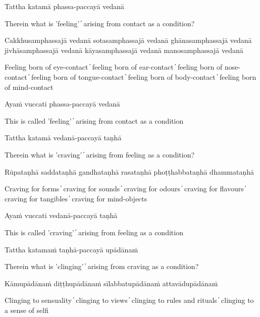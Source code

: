 Tattha katamā phassa-paccayā vedanā

\begin{cprenglish}
Therein what is 'feeling'  ̓  arising from contact as a condition?
\end{cprenglish}

Cakkhusamphassajā vedanā sotasamphassajā vedanā ghānasamphassajā vedanā jivhāsamphassajā vedanā kāyasamphassajā vedanā manosamphassajā vedanā

\begin{cprenglish}
Feeling born of eye-contact  ̓  feeling born of ear-contact  ̓
feeling born of nose-contact  ̓  feeling born of tongue-contact  ̓  feeling born of body-contact  ̓  feeling born of mind-contact
\end{cprenglish}

Ayaṁ vuccati phassa-paccayā vedanā

\begin{cprenglish}
This is called 'feeling'  ̓  arising from contact as a condition
\end{cprenglish}

Tattha katamā vedanā-paccayā taṇhā

\begin{cprenglish}
Therein what is 'craving'  ̓  arising from feeling as a condition?
\end{cprenglish}

Rūpataṇhā saddataṇhā gandhataṇhā rasataṇhā phoṭṭhabbataṇhā dhammataṇhā

\begin{cprenglish}
Craving for forms  ̓  craving for sounds  ̓  craving for odours  ̓  craving for flavours  ̓  craving for tangibles  ̓  craving for mind-objects
\end{cprenglish}

Ayaṁ vuccati vedanā-paccayā taṇhā

\begin{cprenglish}
This is called 'craving'  ̓  arising from feeling as a condition
\end{cprenglish}

Tattha katamaṁ taṇhā-paccayā upādānaṁ

\begin{cprenglish}
Therein what is 'clinging'  ̓  arising from craving as a condition?
\end{cprenglish}

Kāmupādānaṁ diṭṭhupādānaṁ sīlabbatupādānaṁ attavādupādānaṁ

\begin{cprenglish}
Clinging to sensuality  ̓  clinging to views  ̓  clinging to rules and rituals  ̓  clinging to a sense of selfi
\end{cprenglish}

